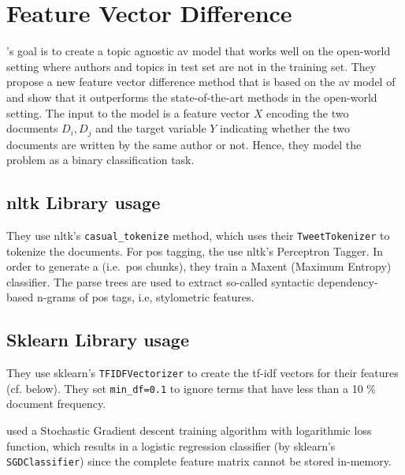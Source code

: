 \section{Feature Vector Difference}
\label{sec:feature_vector_difference}

\citet{weerasinghe_feature_vector_difference_2021}'s goal is to create a topic agnostic \ac{av} model that works well on the open-world setting 
where authors and topics in test set are not in the training set. They propose a new feature vector difference method that is based on the \ac{av} model of \citet{stamatatos_2020} and show that it outperforms the state-of-the-art methods in the open-world setting.
The input to the model is a feature vector $X$ encoding the two documents $D_i,D_j$ 
and the target variable $Y$ indicating whether the two documents are written by the same author or not. 
Hence, they model the problem as a binary classification task.

\subsection{\ac{nltk} Library usage}
They use \ac{nltk}'s \texttt{casual\_tokenize} method, which uses their \texttt{TweetTokenizer} to tokenize the documents.
For \ac{pos} tagging, the use \ac{nltk}'s Perceptron Tagger.
In order to generate a  (i.e.\ \ac{pos} chunks), they train a Maxent (Maximum Entropy) classifier.
The parse trees are used to extract so-called syntactic dependency-based n-grams of \ac{pos} tags, i.e, stylometric features.

\subsection{Sklearn Library usage}
They use \ac{sklearn}'s \texttt{TFIDFVectorizer} to create the \ac{tf-idf} vectors for their features (cf. below).
They set \texttt{min\_df=0.1} to ignore terms that have less than a 10 \% document frequency.

\citet{weerasinghe_feature_vector_difference_2021} used a Stochastic Gradient descent training algorithm with logarithmic loss function, 
which results in a logistic regression classifier (by sklearn's  \texttt{SGDClassifier}) since the complete feature matrix cannot be stored in-memory.

